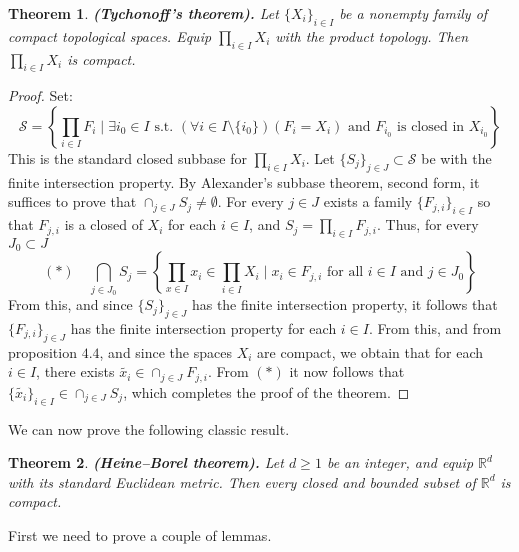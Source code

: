 \documentclass[11pt,a4paper]{article}
\theoremstyle{definition}
\theoremstyle{plain}
\newtheorem{theorem}{Theorem}[section]
\newcommand{\st}{\text{ s.t. }}
\newcommand{\R}{\mathbb{R}}
\newcommand{\set}[2]{ \left\{ #1 \mid #2 \right\} }
\renewcommand{\tt}[1]{\textnormal{\textbf{(#1).}}} %
\begin{document}
  \begin{theorem}
    \tt{Tychonoff’s theorem}
    Let $\{X_i\}_{i \in I}$ be a nonempty family of compact topological 
    spaces. Equip $\prod_{i \in I}{X_i}$ with the product topology. Then 
    $\prod_{i \in I}{X_i}$ is compact.
  \end{theorem}
  \begin{proof}
    Set:
    \[
      \mathcal{S} = 
      \left\{\prod_{i \in I}{F_i} \mid \exists i_0 \in I \st
      (\forall i \in I \setminus \{i_0\})(F_i = X_i) \text{ and }
      F_{i_0} \text{ is closed in } X_{i_0}
      \right\}
    \]
    This is the standard closed subbase for $\prod_{i \in I}{X_i}$.
    Let $\{S_j\}_{j \in J} \subset \mathcal{S}$ be with the finite
    intersection property. By Alexander's subbase theorem, second form, 
    it suffices to prove that $\cap_{j \in J}{S_j} \neq \emptyset$.
    For every $j \in J$ exists a family $\{F_{j,i}\}_{i \in I}$ so that
    $F_{j,i}$ is a closed of $X_i$ for each $i \in I$, and 
    $S_j = \prod_{i \in I}{F_{j,i}}$. Thus, for every $J_0 \subset J$
    \[
      (*) \quad \bigcap_{j \in J_0}{{S}_j} = 
      \set{\prod_{x \in I}{x_i} \in \prod_{i \in I}{X_i}}
      {x_i \in F_{j,i} \text{ for all $i \in I$ and $j \in J_0$}}
    \]
    From this, and since $\{S_j\}_{j \in J}$ has the finite intersection
    property, it follows that $\{F_{j,i}\}_{j \in J}$ has the finite
    intersection property for each $i \in I$. From this, and from 
    proposition $4.4$, and since the spaces $X_i$ are compact, we obtain
    that for each $i \in I$, there exists 
    $\tilde{x_i} \in \cap_{j \in J}{F_{j,i}}$. From $(*)$ it now follows
    that $\{\tilde{x_i}\}_{i \in I} \in \cap_{j \in J}{{S}_j}$, which
    completes the proof of the theorem.
  \end{proof}

  We can now prove the following classic result.

  \begin{theorem}\label{thm:heine-borel}
    \tt{Heine–Borel theorem}
    Let $d \geq 1$ be an integer, and equip $\R^d$ with its standard 
    Euclidean metric. Then every closed and bounded subset of $\R^d$ is
    compact.
  \end{theorem}

  First we need to prove a couple of lemmas.
\end{document}
